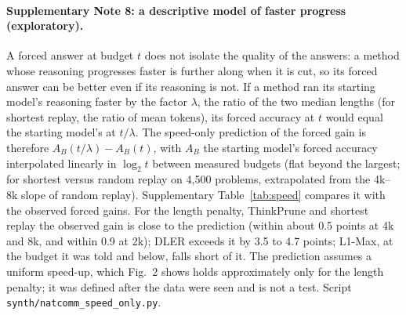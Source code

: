 \documentclass[10pt]{article}
\begin{document}
\paragraph{Supplementary Note 8: a descriptive model of faster progress (exploratory).} A forced answer at budget $t$ does not isolate the quality of the answers: a method whose reasoning progresses faster is further along when it is cut, so its forced answer can be better even if its reasoning is not. If a method ran its starting model's reasoning faster by the factor $\lambda$, the ratio of the two median lengths (for shortest replay, the ratio of mean tokens), its forced accuracy at $t$ would equal the starting model's at $t/\lambda$. The speed-only prediction of the forced gain is therefore $A_B(t/\lambda)-A_B(t)$, with $A_B$ the starting model's forced accuracy interpolated linearly in $\log_2 t$ between measured budgets (flat beyond the largest; for shortest versus random replay on 4{,}500 problems, extrapolated from the 4k--8k slope of random replay). Supplementary Table~\ref{tab:speed} compares it with the observed forced gains. For the length penalty, ThinkPrune and shortest replay the observed gain is close to the prediction (within about 0.5 points at 4k and 8k, and within 0.9 at 2k); DLER exceeds it by 3.5 to 4.7 points; L1-Max, at the budget it was told and below, falls short of it. The prediction assumes a uniform speed-up, which Fig.~2 shows holds approximately only for the length penalty; it was defined after the data were seen and is not a test. Script \texttt{synth/natcomm\_speed\_only.py}.
\end{document}
